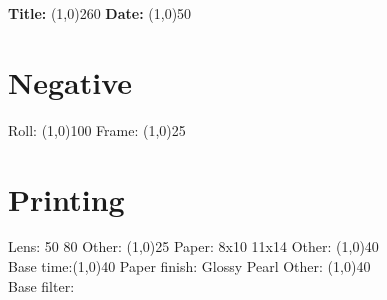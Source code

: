\documentclass{article}
\begin{document}

\textbf{Title:} \line(1,0){260}  
\hfill  %
\textbf{Date:} \line(1,0){50}



\bigskip

\section{Negative}

Roll: \line(1,0){100}  \hspace{1cm} Frame: \line(1,0){25}


\bigskip

\section{Printing}

Lens:  \hspace{.5cm} 50 \hspace{.5cm} 80 \hspace{.5cm} Other: \line(1,0){25} \hfill Paper:  \hspace{.5cm} 8x10 \hspace{.5cm} 11x14 \hspace{.5cm} Other: \line(1,0){40}\\

Base time:\line(1,0){40} \hfill Paper finish: Glossy \hspace{.5cm} Pearl \hspace{.5cm}  Other: \line(1,0){40}  \\
Base filter:\\
\end{document}
